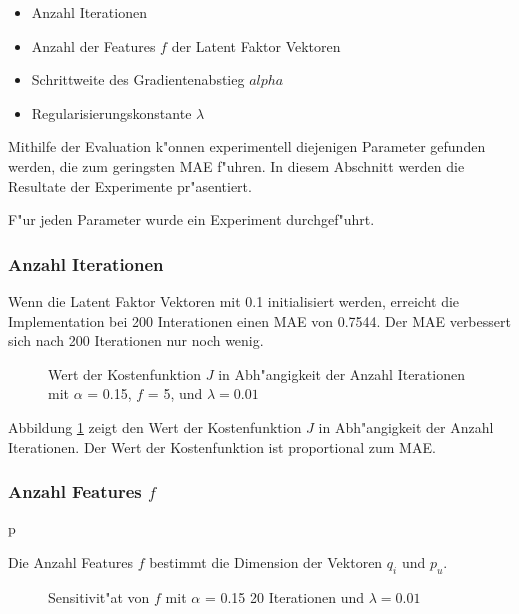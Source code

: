 \documentclass[a4paper, 12pt]{article}
\begin{document}
\begin{itemize}
\item Anzahl Iterationen
\item Anzahl der Features $f$ der Latent Faktor Vektoren
\item Schrittweite des Gradientenabstieg $alpha$
\item Regularisierungskonstante $\lambda$
\end{itemize}

Mithilfe der Evaluation k"onnen experimentell diejenigen Parameter gefunden werden, die zum geringsten MAE f"uhren. In diesem Abschnitt werden die Resultate der Experimente pr"asentiert. 

F"ur jeden Parameter wurde ein Experiment durchgef"uhrt.

\subsubsection{Anzahl Iterationen}

Wenn die Latent Faktor Vektoren mit 0.1 initialisiert werden, erreicht die Implementation bei 200 Interationen einen MAE von 0.7544. Der MAE verbessert sich nach 200 Iterationen nur noch wenig.

\begin{figure}
  \centering
{}
\caption{Wert der Kostenfunktion $J$ in Abh"angigkeit der Anzahl Iterationen mit $\alpha$ = 0.15, $f$ = 5, und $\lambda=0.01$}
\label{fig:itercostj}
\end{figure}

Abbildung \ref{fig:itercostj} zeigt den Wert der Kostenfunktion $J$ in Abh"angigkeit der Anzahl Iterationen. Der Wert der Kostenfunktion ist proportional zum MAE.

\subsubsection{Anzahl Features $f$}p

Die Anzahl Features $f$ bestimmt die Dimension der Vektoren $q_i$ und $p_u$.

\begin{figure}
  \centering
{}
\caption{Sensitivit"at von $f$ mit $\alpha$ = 0.15 20 Iterationen und $\lambda=0.01$}
\label{fig:sensf}
\end{figure}
\end{document}
